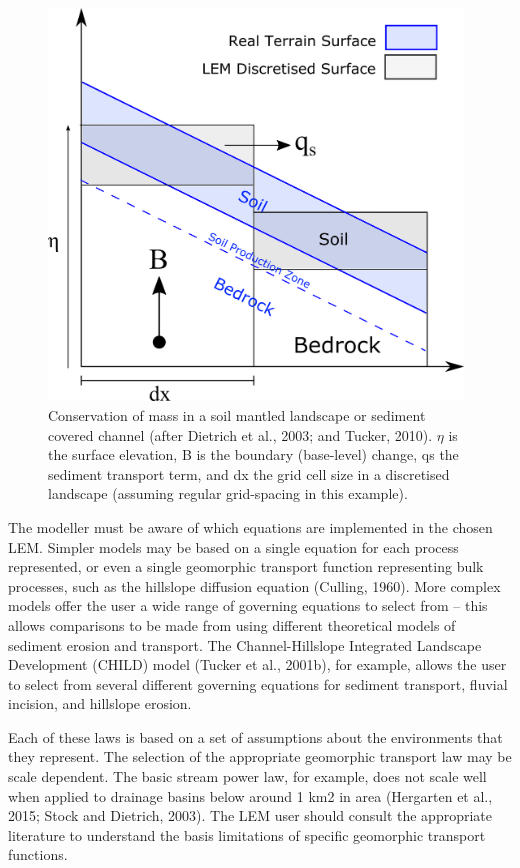 \begin{figure}[t]
\includegraphics[width=11cm]{LEMFinalRevisedmanuscriptDAVFinalrevisions-img/LEMFinalRevisedmanuscriptDAVFinalrevisions-img003.png} 
\caption{Conservation of mass in a soil mantled landscape or sediment covered channel (after Dietrich et al., 2003; and Tucker, 2010). $\eta $ is the surface elevation, B is the boundary (base-level) change, qs the sediment transport term, and dx the grid cell size in a discretised landscape (assuming regular grid-spacing in this example).}
\label{fig_conservation_mass}
\end{figure}

The modeller must be aware of which equations are implemented in the chosen LEM. Simpler models may be based on a single equation for each process represented, or even a single geomorphic transport function representing bulk processes, such as the hillslope diffusion equation (Culling, 1960). More complex models offer the user a wide range of governing equations to select from – this allows comparisons to be made from using different theoretical models of sediment erosion and transport. The Channel-Hillslope Integrated Landscape Development (CHILD) model (Tucker et al., 2001b), for example, allows the user to select from several different governing equations for sediment transport, fluvial incision, and hillslope erosion.  

Each of these laws is based on a set of assumptions about the environments that they represent. The selection of the appropriate geomorphic transport law may be scale dependent. The basic stream power law, for example, does not scale well when applied to drainage basins below around 1 km2 in area (Hergarten et al., 2015; Stock and Dietrich, 2003). The LEM user should consult the appropriate literature to understand the basis limitations of specific geomorphic transport functions.

